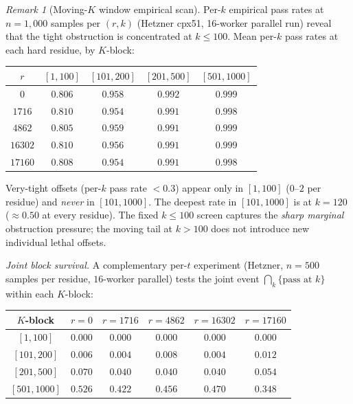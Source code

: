 \documentclass[11pt]{article}
\renewcommand{\_}{\origunderscore\allowbreak}
\theoremstyle{definition}
\theoremstyle{remark}
\newtheorem{remark}[theorem]{Remark}
\begin{document}
\begin{remark}[Moving-$K$ window empirical scan]\label{rem:moving_k_empirical}
Per-$k$ empirical pass rates at $n=1{,}000$ samples per $(r, k)$
(Hetzner cpx51, 16-worker parallel run) reveal that the tight
obstruction is concentrated at $k\le 100$.  Mean per-$k$ pass rates
at each hard residue, by $K$-block:

\begin{center}
\begin{tabular}{c|cccc}
\hline
$r$ & $[1, 100]$ & $[101, 200]$ & $[201, 500]$ & $[501, 1000]$ \\
\hline
$0$     & $0.806$ & $0.958$ & $0.992$ & $0.999$ \\
$1716$  & $0.810$ & $0.954$ & $0.991$ & $0.998$ \\
$4862$  & $0.805$ & $0.959$ & $0.991$ & $0.999$ \\
$16302$ & $0.810$ & $0.956$ & $0.991$ & $0.999$ \\
$17160$ & $0.808$ & $0.954$ & $0.991$ & $0.998$ \\
\hline
\end{tabular}
\end{center}

\noindent Very-tight offsets (per-$k$ pass rate $<0.3$) appear only in
$[1, 100]$ ($0$--$2$ per residue) and \emph{never} in $[101, 1000]$.
The deepest rate in $[101, 1000]$ is at $k=120$ ($\approx 0.50$ at
every residue).  The fixed $k\le 100$ screen captures the
\emph{sharp marginal} obstruction pressure; the moving tail at
$k>100$ does not introduce new individual lethal offsets.

\emph{Joint block survival.} A complementary per-$t$ experiment
(Hetzner, $n=500$ samples per residue, $16$-worker parallel)
tests the joint event $\bigcap_k \{\text{pass at }k\}$ within each
$K$-block:

\begin{center}
\begin{tabular}{c|ccccc}
\hline
$K$-block & $r=0$ & $r=1716$ & $r=4862$ & $r=16302$ & $r=17160$ \\
\hline
$[1, 100]$     & $0.000$ & $0.000$ & $0.000$ & $0.000$ & $0.000$ \\
$[101, 200]$   & $0.006$ & $0.004$ & $0.008$ & $0.004$ & $0.012$ \\
$[201, 500]$   & $0.070$ & $0.040$ & $0.040$ & $0.040$ & $0.054$ \\
$[501, 1000]$  & $0.526$ & $0.422$ & $0.456$ & $0.470$ & $0.348$ \\
\hline
\end{tabular}
\end{center}


\end{remark}
\end{document}
